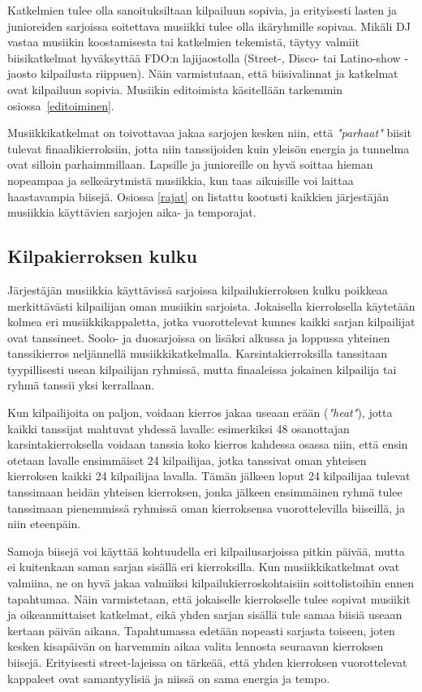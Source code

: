 \documentclass[12pt, a4paper, oneside]{article}
\begin{document}
Katkelmien tulee olla sanoituksiltaan kilpailuun sopivia, ja erityisesti lasten ja junioreiden sarjoissa soitettava musiikki tulee olla ikäryhmille sopivaa. Mikäli DJ vastaa musiikin koostamisesta tai katkelmien tekemistä, täytyy valmiit biisikatkelmat hyväksyttää FDO:n lajijaostolla (Street-, Disco- tai Latino-show -jaosto kilpailusta riippuen). Näin varmistutaan, että biisivalinnat ja katkelmat ovat kilpailuun sopivia. Musiikin editoimista käsitellään tarkemmin osiossa~\ref{editoiminen}.

Musiikkikatkelmat on toivottavaa jakaa sarjojen kesken niin, että \textit{"parhaat"} biisit tulevat finaalikierroksiin, jotta niin tanssijoiden kuin yleisön energia ja tunnelma ovat silloin parhaimmillaan. Lapsille ja junioreille on hyvä soittaa hieman nopeampaa ja selkeärytmistä musiikkia, kun taas aikuisille voi laittaa haastavampia biisejä. Osiossa \ref{rajat} on listattu kootusti kaikkien järjestäjän musiikkia käyttävien sarjojen aika- ja temporajat.

\subsection{Kilpakierroksen kulku}

Järjestäjän musiikkia käyttävissä sarjoissa kilpailukierroksen kulku poikkeaa merkittävästi kilpailijan oman musiikin sarjoista. Jokaisella kierroksella käytetään kolmea eri musiikkikappaletta, jotka vuorottelevat kunnes kaikki sarjan kilpailijat ovat tanssineet. Soolo- ja duosarjoissa on lisäksi alkussa ja loppussa yhteinen tanssikierros neljännellä musiikkikatkelmalla. Karsintakierroksilla tanssitaan tyypillisesti usean kilpailijan ryhmissä, mutta finaaleissa jokainen kilpailija tai ryhmä tanssii yksi kerrallaan.

Kun kilpailijoita on paljon, voidaan kierros jakaa useaan erään (\textit{"heat"}), jotta kaikki tanssijat mahtuvat yhdessä lavalle: esimerkiksi 48 osanottajan karsintakierroksella voidaan tanssia koko kierros kahdessa osassa niin, että ensin otetaan lavalle ensimmäiset 24 kilpailijaa, jotka tanssivat oman yhteisen kierroksen kaikki 24 kilpailijaa lavalla. Tämän jälkeen loput 24 kilpailijaa tulevat tanssimaan heidän yhteisen kierroksen, jonka jälkeen ensimmäinen ryhmä tulee tanssimaan pienemmissä ryhmissä oman kierroksensa vuorottelevilla biiseillä, ja niin eteenpäin.

Samoja biisejä voi käyttää kohtuudella eri kilpailusarjoissa pitkin päivää, mutta ei kuitenkaan saman sarjan sisällä eri kierroksilla. Kun musiikkikatkelmat ovat valmiina, ne on hyvä jakaa valmiiksi kilpailukierroskohtaisiin soittolistoihin ennen tapahtumaa. Näin varmistetaan, että jokaiselle kierrokselle tulee sopivat musiikit ja oikeanmittaiset katkelmat, eikä yhden sarjan sisällä tule samaa biisiä useaan kertaan päivän aikana. Tapahtumassa edetään nopeasti sarjasta toiseen, joten kesken kisapäivän on harvemmin aikaa valita lennosta seuraavan kierroksen biisejä. Erityisesti street-lajeissa on tärkeää, että yhden kierroksen vuorottelevat kappaleet ovat samantyylisiä ja niissä on sama energia ja tempo.
\end{document}
